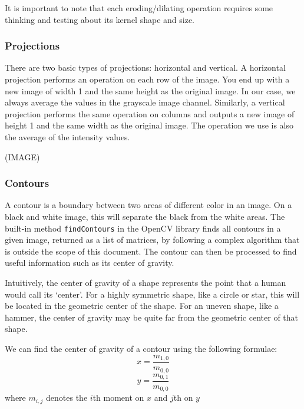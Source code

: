 It is important to note that each eroding/dilating operation requires some thinking and testing about its kernel shape and size.

\subsubsection{Projections}

There are two basic types of projections: horizontal and vertical. A horizontal projection performs an operation on each row of the image. You end up with a new image of width 1 and the same height as the original image. In our case, we always average the values in the grayscale image channel.
Similarly, a vertical projection performs the same operation on columns and outputs a new image of height 1 and the same width as the original image. The operation we use is also the average of the intensity values.

(IMAGE)

\subsubsection{Contours}

A contour is a boundary between two areas of different color in an image. On a black and white image, this will separate the black from the white areas. The built-in method \verb!findContours!\cite{findContours} in the OpenCV library finds all contours in a given image, returned as a list of matrices, by following a complex algorithm that is outside the scope of this document. The contour can then be processed to find useful information such as its center of gravity.

Intuitively, the center of gravity of a shape represents the point that a human would call its ‘center’. For a highly symmetric shape, like a circle or star, this will be located in the geometric center of the shape. For an uneven shape, like a hammer, the center of gravity may be quite far from the geometric center of that shape.

We can find the center of gravity of a contour using the following formulae:
\begin{equation}
    x = \frac{ m_{1,0}}{m_{0,0}}
\end{equation}
\begin{equation}
    y = \frac{m_{0,1}}{m_{0,0}}
\end{equation}
where $m_{i,j}$ denotes the $i$th moment on $x$ and $j$th on $y$



